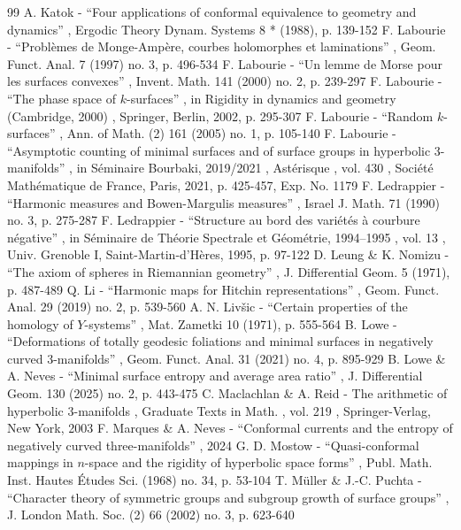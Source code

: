 \begin{thebibliography}{99}
 A. Katok - “Four applications of conformal equivalence to geometry and dynamics” , Ergodic Theory Dynam. Systems 8 * (1988), p. 139-152
 F. Labourie - “Problèmes de Monge-Ampère, courbes holomorphes et laminations” , Geom. Funct. Anal. 7 (1997) no. 3, p. 496-534
 F. Labourie - “Un lemme de Morse pour les surfaces convexes” , Invent. Math. 141 (2000) no. 2, p. 239-297
 F. Labourie - “The phase space of $k$-surfaces” , in Rigidity in dynamics and geometry (Cambridge, 2000) , Springer, Berlin, 2002, p. 295-307
 F. Labourie - “Random $k$-surfaces” , Ann. of Math. (2) 161 (2005) no. 1, p. 105-140
 F. Labourie - “Asymptotic counting of minimal surfaces and of surface groups in hyperbolic 3-manifolds” , in Séminaire Bourbaki, 2019/2021 , Astérisque , vol. 430 , Société Mathématique de France, Paris, 2021, p. 425-457, Exp. No. 1179
 F. Ledrappier - “Harmonic measures and Bowen-Margulis measures” , Israel J. Math. 71 (1990) no. 3, p. 275-287
 F. Ledrappier - “Structure au bord des variétés à courbure négative” , in Séminaire de Théorie Spectrale et Géométrie, 1994–1995 , vol. 13 , Univ. Grenoble I, Saint-Martin-d’Hères, 1995, p. 97-122
 D. Leung \& K. Nomizu - “The axiom of spheres in Riemannian geometry” , J. Differential Geom. 5 (1971), p. 487-489
 Q. Li - “Harmonic maps for Hitchin representations” , Geom. Funct. Anal. 29 (2019) no. 2, p. 539-560
 A. N. Livšic - “Certain properties of the homology of $Y$-systems” , Mat. Zametki 10 (1971), p. 555-564
 B. Lowe - “Deformations of totally geodesic foliations and minimal surfaces in negatively curved 3-manifolds” , Geom. Funct. Anal. 31 (2021) no. 4, p. 895-929
 B. Lowe \& A. Neves - “Minimal surface entropy and average area ratio” , J. Differential Geom. 130 (2025) no. 2, p. 443-475
 C. Maclachlan \& A. Reid - The arithmetic of hyperbolic $3$-manifolds , Graduate Texts in Math. , vol. 219 , Springer-Verlag, New York, 2003
 F. Marques \& A. Neves - “Conformal currents and the entropy of negatively curved three-manifolds” , 2024
 G. D. Mostow - “Quasi-conformal mappings in $n$-space and the rigidity of hyperbolic space forms” , Publ. Math. Inst. Hautes Études Sci. (1968) no. 34, p. 53-104
 T. Müller \& J.-C. Puchta - “Character theory of symmetric groups and subgroup growth of surface groups” , J. London Math. Soc. (2) 66 (2002) no. 3, p. 623-640

\end{thebibliography}
